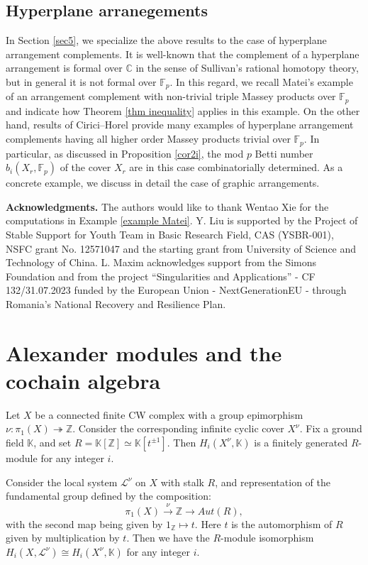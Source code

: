 \documentclass[12pt,leqno,twoside]{amsart}
\theoremstyle{plain}
\theoremstyle{definition}
\newcommand{\C}{\mathbb{C}}
\newcommand{\Z}{\mathbb{Z}}
\newcommand{\K}{\mathbb{K}}
\newcommand{\F}{\mathbb{F}}
\newcommand{\sL}{\mathcal{L}}
\begin{document}
\subsection{Hyperplane arranegements}
In Section \ref{sec5}, we specialize the above results to the case of hyperplane arrangement complements. 
It is well-known that the complement of a hyperplane arrangement is formal over $\C$ in the sense of Sullivan’s rational
homotopy theory, but in general it is not formal over $\F_p$.  In this regard, we recall Matei's example of an arrangement complement with non-trivial triple Massey products over $\F_p$ \cite{Mat} and indicate how Theorem \ref{thm inequality} applies in this example. On the other hand, results of Cirici--Horel \cite{CH22} provide many examples of hyperplane arrangement complements having all higher order Massey products trivial over $\F_p$. In particular, as discussed in Proposition \ref{cor2i}, the mod $p$ Betti number  $b_i(X_r,\F_p)$ of the cover $X_r$ are in this case combinatorially determined. As a concrete example, we discuss in detail the case of graphic arrangements.


\medskip

{\bf Acknowledgments.} 
The authors would like to thank Wentao Xie for the computations in Example \ref{example Matei}.
Y. Liu is supported by the Project of Stable Support for Youth Team in Basic Research Field, CAS (YSBR-001), NSFC grant No. 12571047 and  the starting grant from University of Science and Technology of China. L. Maxim acknowledges support from the Simons Foundation and from the project ``Singularities and Applications'' - CF 132/31.07.2023 funded by the European Union - NextGenerationEU - through Romania's National Recovery and Resilience Plan. 


\section{Alexander modules and the cochain algebra}\label{sec2}

Let $X$ be a connected finite CW complex with a group epimorphism $\nu \colon \pi_1(X)\twoheadrightarrow \Z$.
Consider the corresponding infinite cyclic cover $X^{\nu}$.  Fix a ground field $\K$, and set $R=\K[\Z]\simeq \K[t^{\pm 1}]$.  Then $H_i(X^\nu, \K)$ is a finitely generated $R$-module for any integer $i$. 



Consider the local system $\sL^\nu $ on $X$ with stalk $R$, and representation of the fundamental group defined by the composition: 
$$ \pi_{1}(X)  \xrightarrow{\nu} \Z   \rightarrow   Aut(R),$$
with the second map being given by  $1_{\Z}\mapsto t$.  Here $t$ is the automorphism of $R$ given by multiplication by $t$. Then we have the $R$-module isomorphism $H_i(X,\sL^\nu) \cong H_i(X^\nu,\K)$ for any integer $i$.
\end{document}
